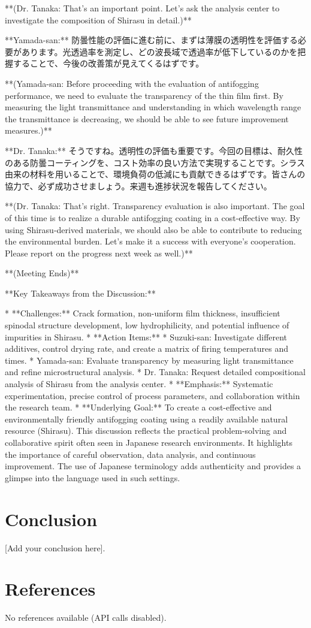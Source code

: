 \documentclass{article}
\begin{document}
**(Dr. Tanaka: That's an important point. Let's ask the analysis center to investigate the composition of Shirasu in detail.)**

**Yamada-san:** 防曇性能の評価に進む前に、まずは薄膜の透明性を評価する必要があります。光透過率を測定し、どの波長域で透過率が低下しているのかを把握することで、今後の改善策が見えてくるはずです。

**(Yamada-san: Before proceeding with the evaluation of antifogging performance, we need to evaluate the transparency of the thin film first. By measuring the light transmittance and understanding in which wavelength range the transmittance is decreasing, we should be able to see future improvement measures.)**

**Dr. Tanaka:** そうですね。透明性の評価も重要です。今回の目標は、耐久性のある防曇コーティングを、コスト効率の良い方法で実現することです。シラス由来の材料を用いることで、環境負荷の低減にも貢献できるはずです。皆さんの協力で、必ず成功させましょう。来週も進捗状況を報告してください。

**(Dr. Tanaka: That's right. Transparency evaluation is also important. The goal of this time is to realize a durable antifogging coating in a cost-effective way. By using Shirasu-derived materials, we should also be able to contribute to reducing the environmental burden. Let's make it a success with everyone's cooperation. Please report on the progress next week as well.)**

**(Meeting Ends)**

**Key Takeaways from the Discussion:**

*   **Challenges:** Crack formation, non-uniform film thickness, insufficient spinodal structure development, low hydrophilicity, and potential influence of impurities in Shirasu.
*   **Action Items:**
    *   Suzuki-san: Investigate different additives, control drying rate, and create a matrix of firing temperatures and times.
    *   Yamada-san: Evaluate transparency by measuring light transmittance and refine microstructural analysis.
    *   Dr. Tanaka: Request detailed compositional analysis of Shirasu from the analysis center.
*   **Emphasis:** Systematic experimentation, precise control of process parameters, and collaboration within the research team.
*   **Underlying Goal:** To create a cost-effective and environmentally friendly antifogging coating using a readily available natural resource (Shirasu).
This discussion reflects the practical problem-solving and collaborative spirit often seen in Japanese research environments. It highlights the importance of careful observation, data analysis, and continuous improvement. The use of Japanese terminology adds authenticity and provides a glimpse into the language used in such settings.


\section{Conclusion}
[Add your conclusion here].

\section{References}
No references available (API calls disabled).
\end{document}

